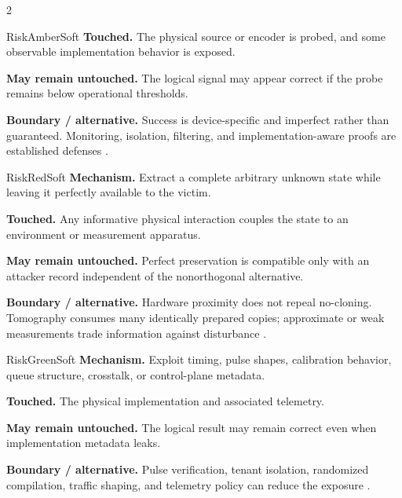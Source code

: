 \begin{multicols}{2}
\begin{matrixrecord}{RiskAmberSoft}
\textbf{Touched.} The physical source or encoder is probed, and some observable implementation behavior is exposed.

\textbf{May remain untouched.} The logical signal may appear correct if the probe remains below operational thresholds.

\textbf{Boundary / alternative.} Success is device-specific and imperfect rather than guaranteed. Monitoring, isolation, filtering, and implementation-aware proofs are established defenses \cite{jiang2024sidechannel,ashsaki2023primer}.

\hfill\matrixback
\end{matrixrecord}

\hypertarget{cell:E4}{}
\begin{matrixrecord}{RiskRedSoft}
\textbf{Mechanism.} Extract a complete arbitrary unknown state while leaving it perfectly available to the victim.

\textbf{Touched.} Any informative physical interaction couples the state to an environment or measurement apparatus.

\textbf{May remain untouched.} Perfect preservation is compatible only with an attacker record independent of the nonorthogonal alternative.

\textbf{Boundary / alternative.} Hardware proximity does not repeal no-cloning. Tomography consumes many identically prepared copies; approximate or weak measurements trade information against disturbance \cite{wootters1982cloning,fuchs1996information}.

\hfill\matrixback
\end{matrixrecord}

\hypertarget{cell:E5}{}
\begin{matrixrecord}{RiskGreenSoft}
\textbf{Mechanism.} Exploit timing, pulse shapes, calibration behavior, queue structure, crosstalk, or control-plane metadata.

\textbf{Touched.} The physical implementation and associated telemetry.

\textbf{May remain untouched.} The logical result may remain correct even when implementation metadata leaks.

\textbf{Boundary / alternative.} Pulse verification, tenant isolation, randomized compilation, traffic shaping, and telemetry policy can reduce the exposure \cite{xu2024pulseattacks,ashsaki2023primer}.


\end{matrixrecord}
\end{multicols}
